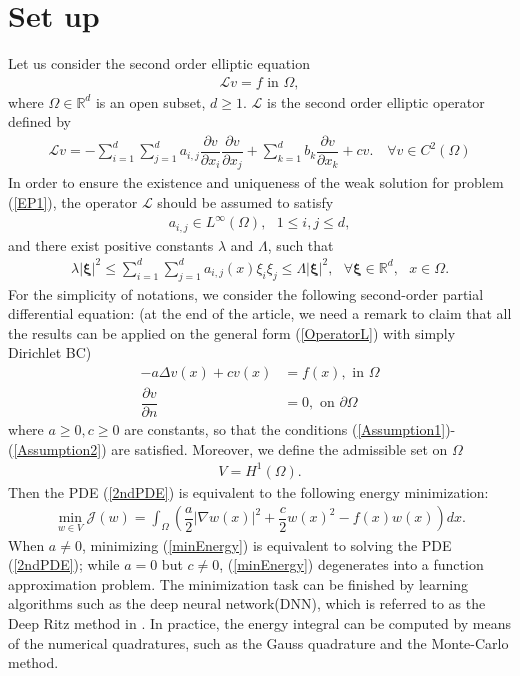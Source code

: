 \documentclass[a4paper, 11pt]{article}
\numberwithin{equation}{section}
\begin{document}
\section{Set up}
\quad\quad Let us consider the second order elliptic equation 
\begin{align}\label{EP1}
\mathcal{L}v = f \text{ in } \Omega,
\end{align}
where $\Omega \in \mathbb{R}^{d}$ is an open subset, $d \geq 1$. $\mathcal{L}$ is the second order elliptic operator defined by 
\begin{align}\label{OperatorL}
\mathcal{L}v = -\sum_{i=1}^{d}\sum_{j=1}^{d} a_{i,j} \dfrac{\partial v}{\partial x_i}\dfrac{\partial v}{\partial x_j} + \sum_{k=1}^{d} b_{k} \dfrac{\partial v}{\partial x_k} + c v. \quad \forall v \in C^2(\Omega)
\end{align} 
In order to ensure the existence and uniqueness of the weak solution for problem (\ref{EP1}), the operator $\mathcal{L}$ should be assumed to satisfy 
\begin{align}\label{Assumption1}
a_{i,j} \in L^{\infty}(\Omega), \text{ } 1\leq i,j\leq d,
\end{align}
and there exist positive constants $\lambda$ and $\Lambda$, such that
\begin{align}\label{Assumption2}
\lambda \vert \boldsymbol{\xi} \vert^2 \leq \sum_{i=1}^{d}\sum_{j=1}^{d} a_{i,j}(x) \xi_i\xi_j \leq \Lambda \vert \boldsymbol{\xi} \vert^2,\text{ } \forall \boldsymbol{\xi}\in \mathbb{R}^{d},\text{ } x\in \Omega.
\end{align}
For the simplicity of notations, we consider the following second-order partial differential equation: {\color{blue} (at the end of the article, we need a remark to claim that all the results can be applied on the general form (\ref{OperatorL}) with simply Dirichlet BC)}
\begin{align} \label{2ndPDE}
-a\Delta v(x) +cv(x) &= f(x), \text{ in } \Omega\\
\dfrac{\partial v}{\partial n } &=0, \text{ on } \partial \Omega
\end{align}
where $a\geq 0,c\geq 0$ are constants, so that the conditions (\ref{Assumption1})-(\ref{Assumption2}) are satisfied. Moreover, we define the admissible set on $\Omega$
\begin{align}
V = H^1(\Omega).
\end{align} 
Then the PDE (\ref{2ndPDE}) is equivalent to the following energy minimization:
\begin{align}\label{minEnergy}
\min_{w\in V} \mathcal{J}(w) = \int_{\Omega}\left( \dfrac{a}{2} \vert \nabla w(x) \vert^2 + \dfrac{c}{2} w(x)^2 - f(x)w(x) \right) dx.
\end{align}
When $a \neq 0$, minimizing (\ref{minEnergy}) is equivalent to solving the PDE (\ref{2ndPDE}); while $a = 0$ but $c \neq 0$, (\ref{minEnergy}) degenerates into a function approximation problem. The minimization task can be finished by learning algorithms such as the deep neural network(DNN), which is referred to as the Deep Ritz method in \cite{RitzE2017}. In practice, the energy integral can be computed by means of the numerical quadratures, such as the Gauss quadrature and the Monte-Carlo method. 
\end{document}
